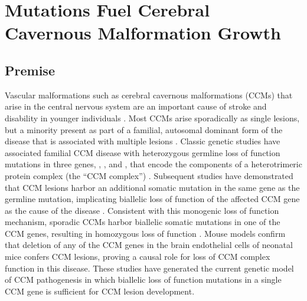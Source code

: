 \chapter{ Mutations Fuel Cerebral Cavernous Malformation Growth}
\label{chap:pik3ca}

\clearpage

\section{Premise}
Vascular malformations such as cerebral cavernous malformations (CCMs) that arise in the central nervous system are an important cause of stroke and disability in younger individuals \citep{heiskanen1993, fischer2013}.  Most CCMs arise sporadically as single lesions, but a minority present as part of a familial, autosomal dominant form of the disease that is associated with multiple lesions \citep{cavalcanti2012}. Classic genetic studies have associated familial CCM disease with heterozygous germline loss of function mutations in three genes, , , and , that encode the components of a heterotrimeric protein complex (the “CCM complex”) \citep{fisher2014, plummer2005}. Subsequent studies have demonstrated that CCM lesions harbor an additional somatic mutation in the same gene as the germline mutation, implicating biallelic loss of function of the affected CCM gene as the cause of the disease \citep{gault2005, akers2009}. Consistent with this monogenic loss of function mechanism, sporadic CCMs harbor biallelic somatic mutations in one of the CCM genes, resulting in homozygous loss of function \citep{mcdonald2014}. Mouse models confirm that deletion of any of the CCM genes in the brain endothelial cells of neonatal mice confers CCM lesions, proving a causal role for loss of CCM complex function in this disease.  These studies have generated the current genetic model of CCM pathogenesis in which biallelic loss of function mutations in a single CCM gene is sufficient for CCM lesion development. 

